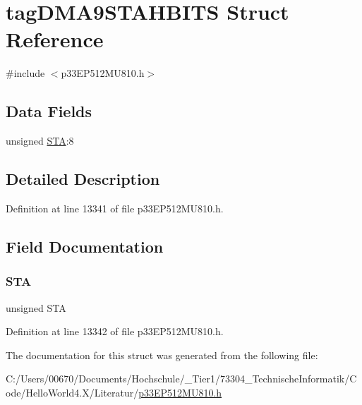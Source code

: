 \hypertarget{structtag_d_m_a9_s_t_a_h_b_i_t_s}{}\section{tag\+D\+M\+A9\+S\+T\+A\+H\+B\+I\+TS Struct Reference}
\label{structtag_d_m_a9_s_t_a_h_b_i_t_s}


{\ttfamily \#include $<$p33\+E\+P512\+M\+U810.\+h$>$}

\subsection*{Data Fields}
\begin{DoxyCompactItemize}
\item 
unsigned \hyperlink{structtag_d_m_a9_s_t_a_h_b_i_t_s_a0eec78ddd2c12af678d5fab70fe62d14}{S\+TA}\+:8
\end{DoxyCompactItemize}


\subsection{Detailed Description}


Definition at line 13341 of file p33\+E\+P512\+M\+U810.\+h.



\subsection{Field Documentation}
\mbox{\label{structtag_d_m_a9_s_t_a_h_b_i_t_s_a0eec78ddd2c12af678d5fab70fe62d14}} 
\subsubsection{\texorpdfstring{S\+TA}{STA}}
{\footnotesize\ttfamily unsigned S\+TA}



Definition at line 13342 of file p33\+E\+P512\+M\+U810.\+h.



The documentation for this struct was generated from the following file\+:\begin{DoxyCompactItemize}
\item 
C\+:/\+Users/00670/\+Documents/\+Hochschule/\+\_\+\+Tier1/73304\+\_\+\+Technische\+Informatik/\+Code/\+Hello\+World4.\+X/\+Literatur/\hyperlink{p33_e_p512_m_u810_8h}{p33\+E\+P512\+M\+U810.\+h}\end{DoxyCompactItemize}
